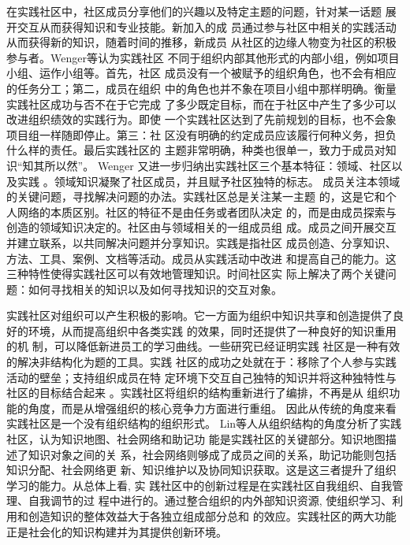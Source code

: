 \documentclass[12pt,a4paper,cs4size]{ctexart}
\begin{document}
在实践社区中，社区成员分享他们的兴趣以及特定主题的问题，针对某一话题
展开交互从而获得知识和专业技能\cite{Wenger2002}。新加入的成
员通过参与社区中相关的实践活动从而获得新的知识，随着时间的推移，新成员
从社区的边缘人物变为社区的积极参与者。Wenger等认为实践社区
不同于组织内部其他形式的内部小组，例如项目小组、运作小组等。首先，社区
成员没有一个被赋予的组织角色，也不会有相应的任务分工；第二，成员在组织
中的角色也并不象在项目小组中那样明确。衡量实践社区成功与否不在于它完成
了多少既定目标，而在于社区中产生了多少可以改进组织绩效的实践行为。即使
一个实践社区达到了先前规划的目标，也不会象项目组一样随即停止。第三：社
区没有明确的约定成员应该履行何种义务，担负什么样的责任。最后实践社区的
主题非常明确，种类也很单一，致力于成员对知识“知其所以然”。
Wenger 又进一步归纳出实践社区三个基本特征：领域、社区以及实践
\cite{wenger2004kmd}。领域知识凝聚了社区成员，并且赋予社区独特的标志。
成员关注本领域的关键问题，寻找解决问题的办法。实践社区总是关注某一主题
的，这是它和个人网络的本质区别。社区的特征不是由任务或者团队决定
的，而是由成员探索与创造的领域知识决定的。社区由与领域相关的一组成员组
成。成员之间开展交互并建立联系，以共同解决问题并分享知识。实践是指社区
成员创造、分享知识、方法、工具、案例、文档等活动。成员从实践活动中改进
和提高自己的能力。这三种特性使得实践社区可以有效地管理知识。时间社区实
际上解决了两个关键问题：如何寻找相关的知识以及如何寻找知识的交互对象\cite{Yang2008}。

实践社区对组织可以产生积极的影响。它一方面为组织中知识共享和创造提供了良好的环境，从而提高组织中各类实践
的效果\cite{lesser2001ucp}，同时还提供了一种良好的知识重用的机
制，可以降低新进员工的学习曲线\cite{dube2005isc}。一些研究已经证明实践
社区是一种有效的解决非结构化为题的工具\cite{vonwartburg2004csa}。实践
社区的成功之处就在于：移除了个人参与实践活动的壁垒；支持组织成员在特
定环境下交互自己独特的知识并将这种独特性与社区的目标结合起来
\cite{ardichvili2003mab}。实践社区将组织的结构重新进行了编排，不再是从
组织功能的角度，而是从增强组织的核心竞争力方面进行重组\cite{Pan2003}。
因此从传统的角度来看实践社区是一个没有组织结构的组织形式\cite{lesser2001cpa}。
Lin等人从组织结构的角度分析了实践社区，认为知识地图、社会网络和助记功
能是实践社区的关键部分\cite{lin2001cmv}。知识地图描述了知识对象之间的关
系，社会网络则够成了成员之间的关系，助记功能则包括知识分配、社会网络更
新、知识维护以及协同知识获取。这是这三者提升了组织学习的能力。从总体上看, 实
践社区中的创新过程是在实践社区自我组织、自我管理、自我调节的过
程中进行的。通过整合组织的内外部知识资源, 使组织学习、利
用和创造知识的整体效益大于各独立组成部分总和
的效应。实践社区的两大功能正是社会化的知识构建并为其提供创新环境。
\end{document}
